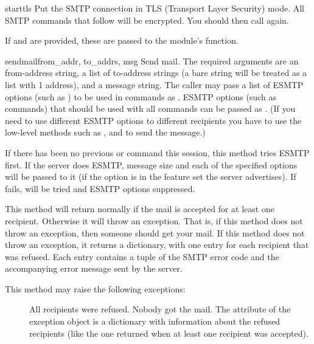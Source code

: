\begin{methoddesc}{starttls}{}
Put the SMTP connection in TLS (Transport Layer Security) mode.  All
SMTP commands that follow will be encrypted.  You should then call
 again.

If  and  are provided, these are passed to
the  module's  function.
\end{methoddesc}

\begin{methoddesc}{sendmail}{from_addr, to_addrs, msg}
Send mail.  The required arguments are an  from-address
string, a list of  to-address strings (a bare string will be
treated as a list with 1 address), and a message string.  The caller
may pass a list of ESMTP options (such as ) to be used
in  commands as .  ESMTP options
(such as  commands) that should be used with all 
commands can be passed as .  (If you need to use
different ESMTP options to different recipients you have to use the
low-level methods such as ,  and
 to send the message.)


If there has been no previous  or  command this
session, this method tries ESMTP  first. If the server does
ESMTP, message size and each of the specified options will be passed
to it (if the option is in the feature set the server advertises).  If
 fails,  will be tried and ESMTP options
suppressed.

This method will return normally if the mail is accepted for at least
one recipient. Otherwise it will throw an exception.  That is, if this
method does not throw an exception, then someone should get your mail.
If this method does not throw an exception, it returns a dictionary,
with one entry for each recipient that was refused.  Each entry
contains a tuple of the SMTP error code and the accompanying error
message sent by the server.

This method may raise the following exceptions:

\begin{description}
\item[]
All recipients were refused.  Nobody got the mail.  The
 attribute of the exception object is a dictionary
with information about the refused recipients (like the one returned
when at least one recipient was accepted).


\end{description}
\end{methoddesc}
